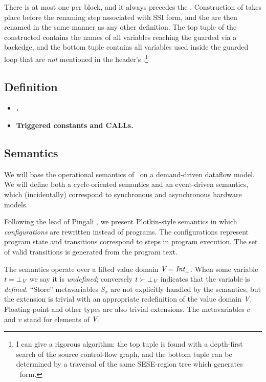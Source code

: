 \documentclass[12pt,titlepage,twoside]{article}
\begin{document}
There is at most one \xifunction{} per \phifunction{} block, and it
always precedes the .  Construction of 
takes place before the renaming step associated with SSI form, and the
 are then renamed in the same manner as any other
definition.  The top tuple of the constructed \xifunction{} contains
the names of all variables reaching the guarded \phifunction{} via a
backedge, and the bottom tuple contains all variables used inside the
guarded loop that are {\em not} mentioned in the header's
\phifunction{}.\footnote{I can give a rigorous algorithm: the top
tuple is found with a depth-first search of the source
control-flow graph, and the bottom tuple can be determined by a
traversal of the same SESE-region tree which generates \ssizero\
form.}


\subsection{Definition}
\begin{itemize}
\item \textbf{.}
\item \textbf{Triggered constants and CALLs.}
\end{itemize}

\subsection{Semantics}\label{sec:semantics}
We will base the operational semantics of \ssiplus\ on a demand-driven
dataflow model.  We will define both a cycle-oriented semantics and an
event-driven semantics, which (incidentally) correspond to synchronous
and asynchronous hardware models.

Following the lead of Pingali \cite{pingali90:dfg}, we present Plotkin-style
semantics \cite{plotkin81:opsem} in which \emph{configurations} are
rewritten instead of programs.  The configurations represent program
state and transitions correspond to steps in program execution.  The
set of valid transitions is generated from the program text.

The semantics operate over a lifted value domain
${\mbox{\em V}}={\mbox{\em Int}}_\bot$. When some variable
$t = \bot_{\mbox{\scriptsize\em V}}$ we say it is
\emph{undefined}; conversely $t\succ\bot_{\mbox{\scriptsize\em V}}$ indicates that the
variable is \emph{defined}.  ``Store'' metavariables $S_x$ are not
explicitly handled by the semantics, but the extension is trivial with
an appropriate redefinition of the value domain ${\mbox{\em V}}$.  Floating-point
and other types are also trivial extensions.  The
metavariables $c$ and $v$ stand for elements of ${\mbox{\em V}}$.
\end{document}
